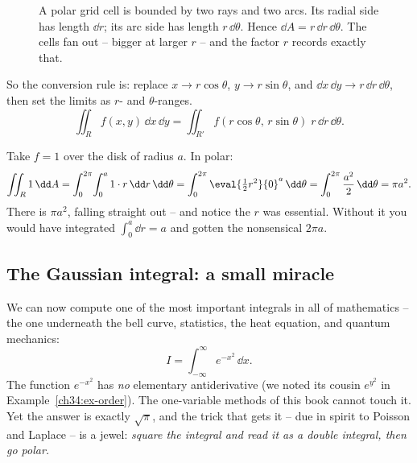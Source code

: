 \begin{figure}[H]
\centering
{}
\caption{A polar grid cell is bounded by two rays and two arcs. Its radial side
has length $\dd r$; its arc side has length $r\,\dd\theta$. Hence
$\dd A=r\,\dd r\,\dd\theta$. The cells fan out -- bigger at larger $r$ -- and the
factor $r$ records exactly that.}
\label{ch34:fig-polar}
\end{figure}

So the conversion rule is: replace $x\to r\cos\theta$, $y\to r\sin\theta$, and
$\dd x\,\dd y\to r\,\dd r\,\dd\theta$, then set the limits as $r$- and
$\theta$-ranges.
\[
  \iint_R f(x,y)\,\dd x\,\dd y
  =\iint_{R'} f(r\cos\theta,\,r\sin\theta)\;r\,\dd r\,\dd\theta .
\]

\begin{example}
\label{ch34:ex-disk}
Take $f=1$ over the disk of radius $a$. In polar:
\[
  \iint_R 1\,\dd A=\int_0^{2\pi}\!\int_0^a 1\cdot r\,\dd r\,\dd\theta
  =\int_0^{2\pi}\eval{\tfrac12 r^2}{0}^{a}\,\dd\theta
  =\int_0^{2\pi}\frac{a^2}{2}\,\dd\theta=\pi a^2 .
\]
There is $\pi a^2$, falling straight out -- and notice the $r$ was essential.
Without it you would have integrated $\int_0^a \dd r=a$ and gotten the
nonsensical $2\pi a$.
\end{example}

\subsection{The Gaussian integral: a small miracle}

We can now compute one of the most important integrals in all of mathematics --
the one underneath the bell curve, statistics, the heat equation, and quantum
mechanics:
\[
  I=\int_{-\infty}^{\infty} e^{-x^2}\,\dd x .
\]
The function $e^{-x^2}$ has \emph{no} elementary antiderivative (we noted its
cousin $e^{y^2}$ in Example~\ref{ch34:ex-order}). The one-variable methods of
this book cannot touch it. Yet the answer is exactly $\sqrt{\pi}$, and the trick
that gets it -- due in spirit to Poisson and Laplace -- is a jewel: \emph{square
the integral and read it as a double integral, then go polar.}

